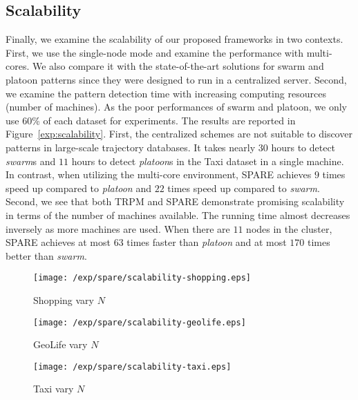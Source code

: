 \subsection{Scalability}
Finally, we examine the scalability of our proposed frameworks in two contexts. 
First, we use the single-node mode and examine the performance with multi-cores. 
We also compare it with the state-of-the-art solutions for swarm and platoon patterns 
since they were designed to run in a centralized server. 
Second, we examine the pattern detection time with increasing computing resources (number of machines). 
As the poor performances of swarm and platoon, we only use 60\% of each dataset for experiments. 
The results are reported in Figure~\ref{exp:scalability}. 
First, the centralized schemes are not suitable to discover patterns in 
large-scale trajectory databases. It takes nearly $30$ hours to 
detect \emph{swarm}s and $11$ hours to detect \emph{platoon}s in the Taxi dataset in a single machine. 
In contrast, when utilizing the multi-core environment, 
SPARE achieves $9$ times speed up compared to \emph{platoon} and $22$ times speed up compared to \emph{swarm}. 
Second, we see that both TRPM and SPARE demonstrate promising scalability in terms of the number of machines available. The running time almost decreases inversely as more machines are used. 
When there are $11$ nodes in the cluster, 
SPARE achieves at most $63$ times faster 
than \emph{platoon} and at most $170$ times better than \emph{swarm}.

\begin{figure*}[t]
\centering
\begin{subfigure}[b]{0.31\textwidth}
    \texttt{[image: /exp/spare/scalability-shopping.eps]}
        \caption{Shopping vary $N$}
    \end{subfigure}
 	 \begin{subfigure}[b]{0.31\textwidth}
        \texttt{[image: /exp/spare/scalability-geolife.eps]}
        \caption{GeoLife vary $N$}
    \end{subfigure}
    	 \begin{subfigure}[b]{0.31\textwidth}
        \texttt{[image: /exp/spare/scalability-taxi.eps]}
        \caption{Taxi vary $N$}
    \end{subfigure}
 \caption{Comparisons among TRMP, SPARE, PLATOON and SWARM.}
 \label{exp:scalability}
\end{figure*}